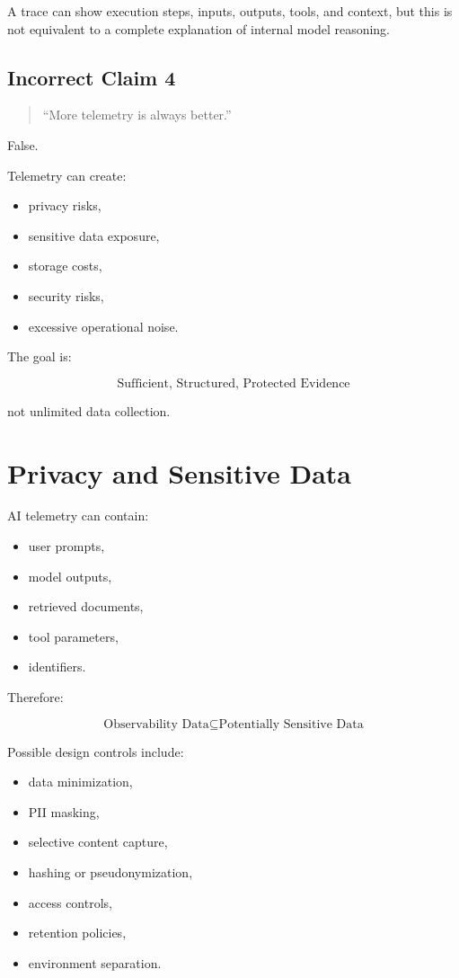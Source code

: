 \documentclass[11pt,a4paper]{article}
\begin{document}
A trace can show execution steps, inputs, outputs, tools, and context, but this is not equivalent to a complete explanation of internal model reasoning.

\subsection{Incorrect Claim 4}

\begin{quote}
``More telemetry is always better.''
\end{quote}

False.

Telemetry can create:

\begin{itemize}
\item privacy risks,
\item sensitive data exposure,
\item storage costs,
\item security risks,
\item excessive operational noise.
\end{itemize}

The goal is:

\[
\boxed{
\text{Sufficient, Structured, Protected Evidence}
}
\]

not unlimited data collection.

\section{Privacy and Sensitive Data}

AI telemetry can contain:

\begin{itemize}
\item user prompts,
\item model outputs,
\item retrieved documents,
\item tool parameters,
\item identifiers.
\end{itemize}

Therefore:

\[
\text{Observability Data} \subseteq \text{Potentially Sensitive Data}
\]

Possible design controls include:

\begin{itemize}
\item data minimization,
\item PII masking,
\item selective content capture,
\item hashing or pseudonymization,
\item access controls,
\item retention policies,
\item environment separation.
\end{itemize}
\end{document}

